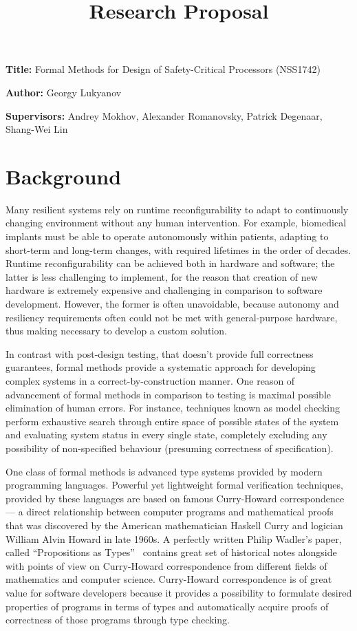 \documentclass[10pt, a4paper]{article}
\title{Research Proposal}
\author{}
\date{}
\newcommand{\namelistlabel}[1]{\mbox{#1}\hfil}
\newenvironment{namelist}[1]{%
\begin{list}{}
    {
        \let\makelabel\namelistlabel
        \settowidth{\labelwidth}{#1}
        \setlength{\leftmargin}{1.1\labelwidth}
    }
  }{%
\end{list}}
\begin{document}
\maketitle

\begin{namelist}{xxxxxxxxxxxx}
\item[{\bf Title:}]
  Formal Methods for Design of Safety-Critical Processors (NSS1742)
\item[{\bf Author:}]
  Georgy Lukyanov
\item[{\bf Supervisors:}]
  Andrey Mokhov, Alexander Romanovsky, Patrick Degenaar, Shang-Wei Lin
\end{namelist}

\section{Background} 

Many resilient systems rely on runtime reconfigurability
to adapt to continuously changing environment without any
human intervention. For example, biomedical implants must
be able to operate autonomously within patients, adapting
to short-term and long-term changes, with required lifetimes
in the order of decades. Runtime reconfigurability can be
achieved both in hardware and software; the latter is less challenging 
to implement, for the reason that creation of new hardware is extremely 
expensive and challenging in comparison to software development. However, the
former is often unavoidable, because autonomy and resiliency requirements often
could not be met with general-purpose hardware, thus making necessary to
develop a custom solution.

In contrast with post-design testing, that doesn't provide full correctness
guarantees, formal methods provide a systematic approach for developing complex
systems in a correct-by-construction manner. One reason of advancement of formal
methods in comparison to testing is maximal possible elimination of human errors.
For instance, techniques known as model checking perform exhaustive search through
entire space of possible states of the system and evaluating system status in
every single state, completely excluding any possibility of non-specified
behaviour (presuming correctness of specification).

One class of formal methods is advanced type systems provided by modern
programming languages. Powerful yet lightweight formal verification techniques,
provided by these languages are based on famous Curry-Howard correspondence ---
a direct relationship between computer programs and mathematical proofs that
was discovered by the American mathematician Haskell Curry and logician William
Alvin Howard in late 1960s. A perfectly written Philip Wadler's paper, called
``Propositions as Types''~\cite{Wadler:2015:PT:2847579.2699407} contains great
set of historical notes alongside with
points of view on Curry-Howard correspondence from different fields of
mathematics and computer science. 
Curry-Howard correspondence is of great value for software developers because
it provides a possibility to formulate desired
properties of programs in terms of types and automatically acquire proofs of
correctness of those programs through type checking.
\end{document}
